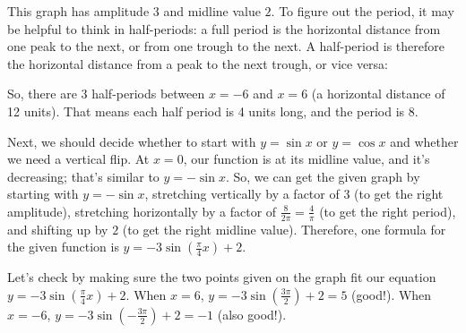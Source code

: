 \documentclass[main]{subfiles}
\begin{document}
\begin{enumerate}[resume]
\begin{enumerate}
    \begin{solution}
      This graph has amplitude $3$ and midline value $2$.  To figure out
      the period, it may be helpful to think in half-periods: a full
      period is the horizontal distance from one peak to the next, or
      from one trough to the next.  A half-period is therefore the
      horizontal distance from a peak to the next trough, or vice versa:
      \begin{center}
      \end{center}
      So, there are 3 half-periods between $x = -6$ and $x = 6$ (a
      horizontal distance of 12 units).  That means each half period is
      4 units long, and the period is 8.

      Next, we should decide whether to start with $y = \sin x$ or $y =
      \cos x$ and whether we need a vertical flip.  At $x = 0$, our
      function is at its midline value, and it's decreasing; that's
      similar to $y = - \sin x$.  So, we can get the given graph by
      starting with $y = - \sin x$, stretching vertically by a factor of
      $3$ (to get the right amplitude), stretching horizontally by a
      factor of $\frac{8}{2 \pi} = \frac{4}{\pi}$ (to get the right
      period), and shifting up by $2$ (to get the right midline value).
      Therefore, one formula for the given function is $\boxed{y = -
        3\sin\left(\frac{\pi}{4} x\right) + 2}$.

      \checkmark
        Let's check by making sure the two points given on the graph fit
        our equation $y = - 3\sin\left(\frac{\pi}{4} x\right) + 2$.
        When $x = 6$, $y = - 3 \sin \left( \frac{3 \pi}{2} \right) + 2 =
        5$ (good!).  When $x = -6$, $y = -3 \sin \left( - \frac{3
            \pi}{2} \right) + 2 = -1$ (also good!).
    \end{solution}

  \end{enumerate}


\end{enumerate}
\end{document}
